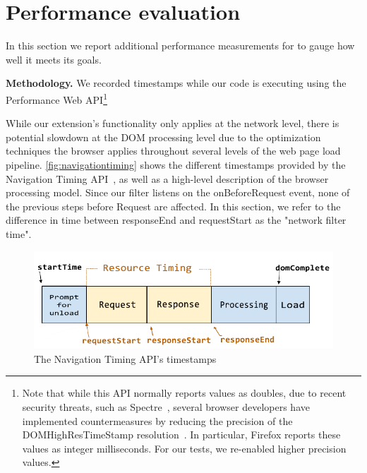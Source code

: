 \appendix

\section{Performance evaluation} \label{appendix:perf-eval}

In this section we report additional performance measurements for \sys
to gauge how well it meets its goals.

\textbf{Methodology.} We recorded timestamps while our code is
executing using the Performance Web API\footnote{Note that while this
  API normally reports values as doubles, due to recent security
  threats, such as Spectre~\cite{DBLP:journals/corr/abs-1801-01203},
  several browser developers have implemented countermeasures by
  reducing the precision of the DOMHighResTimeStamp
  resolution~\cite{reducetimeprecision,resolutionconsiderations}. In
  particular, Firefox reports these values as integer
  milliseconds. For our tests, we re-enabled higher precision values.}

While our extension's functionality only applies at the network level,
there is potential slowdown at the DOM processing level due to the
optimization techniques the browser applies throughout several levels
of the web page load pipeline. \autoref{fig:navigationtiming} shows
the different timestamps provided by the Navigation Timing
API~\cite{navigationtiming}, as well as a high-level description of
the browser processing model. Since our filter listens on the
onBeforeRequest event, none of the previous steps before Request are
affected. In this section, we refer to the difference in time between
responseEnd and requestStart as the "network filter time".

\begin{figure}[h]
	\begin{center}
 \includegraphics[scale=0.65]{img/timestamp-diagram-edited.pdf}
 \end{center}
 \caption{The Navigation Timing API's timestamps\protect\footnotemark}
 \label{fig:navigationtiming}
 \end{figure}

